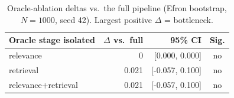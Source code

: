\begin{table}[htbp]
  \centering
  \caption{Oracle-ablation deltas vs.\ the full pipeline (Efron bootstrap, $N=1000$, seed 42). Largest positive $\Delta$ = bottleneck.}
  \label{tab:e2e-deltas}
  \begin{tabular}{lrrc}
    \toprule
    Oracle stage isolated & $\Delta$ vs.\ full & 95\% CI & Sig. \\
    \midrule
    relevance & 0 & [0.000, 0.000] & no \\
    retrieval & 0.021 & [-0.057, 0.100] & no \\
    relevance+retrieval & 0.021 & [-0.057, 0.100] & no \\
    \bottomrule
  \end{tabular}
\end{table}
